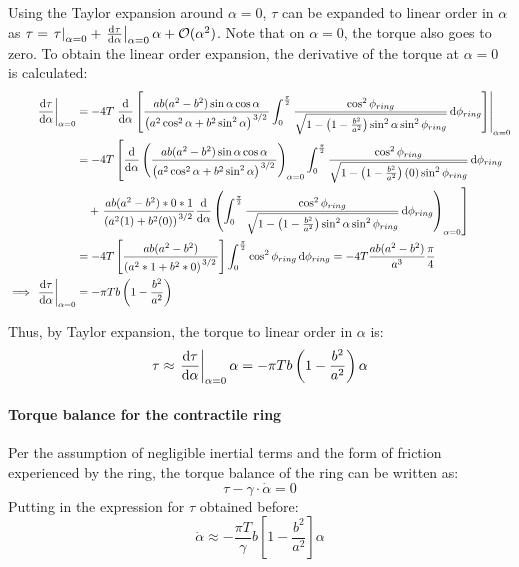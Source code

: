 Using the Taylor expansion around $\alpha = 0$, $\tau$ can be expanded to linear order in $\alpha$ as $\tau = \left.\tau\right|_{\alpha=0} + \left.\dv{\tau}{\alpha}\right|_{\alpha=0}\alpha + \mathcal{O}(\alpha^2)$. Note that on $\alpha = 0$, the torque also goes to zero. To obtain the linear order expansion, the derivative of the torque at $\alpha = 0$ is calculated:
\begin{align*}
    \left.\dv{\tau}{\alpha}\right|_{\alpha=0} &= -4T\left.\dv{\alpha}\left[\frac{ab(a^2 - b^2)\sin\alpha\cos\alpha}{\left(a^2\cos^2\alpha + b^2\sin^2\alpha\right)^{\flatfrac{3}{2}}}\int_0^{\frac{\pi}{2}}\frac{\cos^2\phi_{ring}}{\sqrt{1 - \left(1 - \frac{b^2}{a^2}\right)\sin^2\alpha\sin^2\phi_{ring}}}\dd{\phi_{ring}}\right]\right|_{\alpha = 0} \\
    &= -4T \left[\dv{\alpha}\left(\frac{ab(a^2 - b^2)\sin\alpha\cos\alpha}{\left(a^2\cos^2\alpha + b^2\sin^2\alpha\right)^{\flatfrac{3}{2}}}\right)_{\alpha=0}\int_0^{\frac{\pi}{2}}\frac{\cos^2\phi_{ring}}{\sqrt{1 - \left(1 - \frac{b^2}{a^2}\right)(0)\sin^2\phi_{ring}}}\dd{\phi_{ring}}\right.\\
    &\quad + \left.\frac{ab(a^2 - b^2)*0*1}{\left(a^2(1) + b^2(0)\right)^{\flatfrac{3}{2}}}\dv{\alpha}\left(\int_0^{\frac{\pi}{2}}\frac{\cos^2\phi_{ring}}{\sqrt{1 - \left(1 - \frac{b^2}{a^2}\right)\sin^2\alpha\sin^2\phi_{ring}}}\dd{\phi_{ring}}\right)_{\alpha=0}\right]\\
    &= -4T \left[\frac{ab(a^2 - b^2)}{\left(a^2*1 + b^2*0\right)^{\flatfrac{3}{2}}}\right] \int_0^{\frac{\pi}{2}}\cos^2\phi_{ring}\dd{\phi_{ring}} = -4T\frac{ab(a^2-b^2)}{a^3}\frac{\pi}{4}\\
    \implies \left.\dv{\tau}{\alpha}\right|_{\alpha=0} &= -\pi T b\left(1 - \frac{b^2}{a^2}\right)
\end{align*}

Thus, by Taylor expansion, the torque to linear order in $\alpha$ is:
\begin{equation} \label{eq:torque}
    \tau \approx \left.\dv{\tau}{\alpha}\right|_{\alpha=0}\alpha =  -\pi T b\left(1 - \frac{b^2}{a^2}\right)\alpha
\end{equation}

\paragraph{Torque balance for the contractile ring}
Per the assumption of negligible inertial terms and the form of friction experienced by the ring, the torque balance of the ring can be written as:
\begin{equation*}
    \tau - \gamma\cdot\dot{\alpha} = 0
\end{equation*}
Putting in the expression for $\tau$ obtained before:
\begin{equation} \label{eq:alphaDot}
    \dot{\alpha} \approx - \frac{\pi T}{\gamma} b\left[1 - \frac{b^2}{a^2}\right]\alpha
\end{equation}


